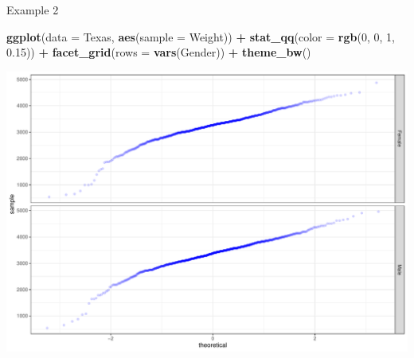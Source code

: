 \documentclass[
  ignorenonframetext,
]{beamer}
\newenvironment{Shaded}{\begin{snugshade}}{\end{snugshade}}
\newcommand{\AttributeTok}[1]{\textcolor[rgb]{0.13,0.29,0.53}{#1}}
\newcommand{\DecValTok}[1]{\textcolor[rgb]{0.00,0.00,0.81}{#1}}
\newcommand{\FloatTok}[1]{\textcolor[rgb]{0.00,0.00,0.81}{#1}}
\newcommand{\FunctionTok}[1]{\textcolor[rgb]{0.13,0.29,0.53}{\textbf{#1}}}
\newcommand{\NormalTok}[1]{#1}
\newcommand{\SpecialCharTok}[1]{\textcolor[rgb]{0.81,0.36,0.00}{\textbf{#1}}}
\begin{document}
\begin{frame}[fragile]{Example 2}
\protect\hypertarget{example-2-2}{}
\tiny

\begin{Shaded}
\begin{Highlighting}[]
\FunctionTok{ggplot}\NormalTok{(}\AttributeTok{data =}\NormalTok{ Texas, }\FunctionTok{aes}\NormalTok{(}\AttributeTok{sample =}\NormalTok{ Weight)) }\SpecialCharTok{+} 
  \FunctionTok{stat\_qq}\NormalTok{(}\AttributeTok{color =} \FunctionTok{rgb}\NormalTok{(}\DecValTok{0}\NormalTok{, }\DecValTok{0}\NormalTok{, }\DecValTok{1}\NormalTok{, }\FloatTok{0.15}\NormalTok{)) }\SpecialCharTok{+} 
  \FunctionTok{facet\_grid}\NormalTok{(}\AttributeTok{rows =} \FunctionTok{vars}\NormalTok{(Gender)) }\SpecialCharTok{+} 
  \FunctionTok{theme\_bw}\NormalTok{()}
\end{Highlighting}
\end{Shaded}

\begin{center}\includegraphics[width=0.8\linewidth,height=0.6\textheight]{Week11_12_13_files/figure-beamer/unnamed-chunk-7-1} \end{center}
\normalsize
\end{frame}
\end{document}
